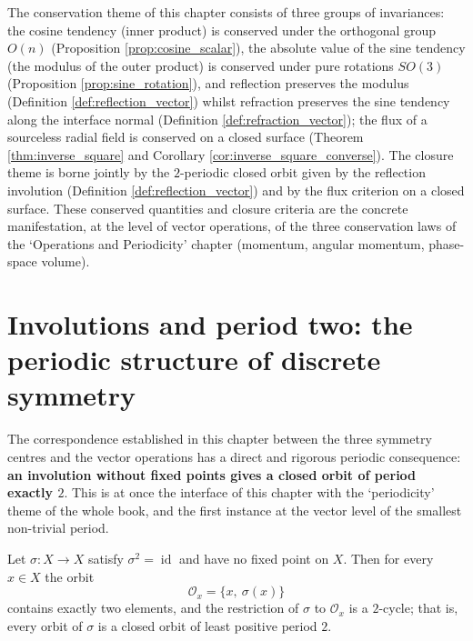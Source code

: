 \begin{remark}\label{rem:conservation_closure_theme_ch3}
The conservation theme of this chapter consists of three groups of invariances: the cosine tendency (inner product) is conserved under the orthogonal group $O(n)$ (Proposition \ref{prop:cosine_scalar}), the absolute value of the sine tendency (the modulus of the outer product) is conserved under pure rotations $SO(3)$ (Proposition \ref{prop:sine_rotation}), and reflection preserves the modulus (Definition \ref{def:reflection_vector}) whilst refraction preserves the sine tendency along the interface normal (Definition \ref{def:refraction_vector}); the flux of a sourceless radial field is conserved on a closed surface (Theorem \ref{thm:inverse_square} and Corollary \ref{cor:inverse_square_converse}). The closure theme is borne jointly by the $2$-periodic closed orbit given by the reflection involution (Definition \ref{def:reflection_vector}) and by the flux criterion on a closed surface. These conserved quantities and closure criteria are the concrete manifestation, at the level of vector operations, of the three conservation laws of the `Operations and Periodicity' chapter (momentum, angular momentum, phase-space volume).
\end{remark}

\section{Involutions and period two: the periodic structure of discrete symmetry}
\label{sec:involution_two_period}

The correspondence established in this chapter between the three symmetry centres and the vector operations has a direct and rigorous periodic consequence: \textbf{an involution without fixed points gives a closed orbit of period exactly $2$}. This is at once the interface of this chapter with the `periodicity' theme of the whole book, and the first instance at the vector level of the smallest non-trivial period.

\begin{proposition}\label{prop:involution_two_period}
Let $\sigma:X\to X$ satisfy $\sigma^2=\operatorname{id}$ and have no fixed point on $X$. Then for every $x\in X$ the orbit
\[
\mathcal{O}_x=\{x,\ \sigma(x)\}
\]
contains exactly two elements, and the restriction of $\sigma$ to $\mathcal{O}_x$ is a $2$-cycle; that is, every orbit of $\sigma$ is a closed orbit of least positive period $2$.
\end{proposition}

